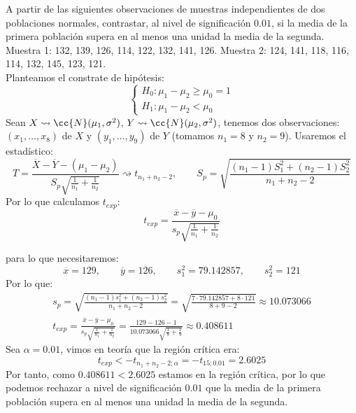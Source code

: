 \begin{ejercicio}
    A partir de las siguientes observaciones de muestras independientes de dos poblaciones normales, contrastar, al nivel de significación $0.01$, si la media de la primera población supera en al menos una unidad la media de la segunda.\newline
    Muestra 1: 132, 139, 126, 114, 122, 132, 141, 126.\newline
    Muestra 2: 124, 141, 118, 116, 114, 132, 145, 123, 121.\\

    \noindent
    Planteamos el constrate de hipótesis:
    \begin{equation*}
        \left\{\begin{array}{l}
            H_0 : \mu_1-\mu_2 \geq \mu_0 = 1 \\
            H_1 : \mu_1-\mu_2 < \mu_0
        \end{array}\right.
    \end{equation*}
    Sean $X\rightsquigarrow \cc{N}(\mu_1, \sigma^2)$, $Y\rightsquigarrow\cc{N}(\mu_2,\sigma^2)$, tenemos dos observaciones: $(x_1, \ldots, x_8)$ de $X$ y $(y_1, \ldots, y_9)$ de $Y$ (tomamos $n_1=8$ y $n_2 = 9$). Usaremos el estadístico:
    \begin{equation*}
        T = \frac{\overline{X}-\overline{Y}-(\mu_1-\mu_2)}{S_p\sqrt{\frac{1}{n_1}+\frac{1}{n_2}}}\rightsquigarrow t_{n_1+n_2-2} , \qquad S_p = \sqrt{\frac{(n_1-1)S_1^2 + (n_2-1)S_2^2}{n_1+n_2-2}}
    \end{equation*}
    Por lo que calculamos $t_{exp}$: 
    \begin{equation*}
        t_{exp} = \frac{\overline{x}-\overline{y}-\mu_0}{s_p\sqrt{\frac{1}{n_1}+\frac{1}{n_2}}}
    \end{equation*}

    para lo que necesitaremos:
    \begin{equation*}
        \overline{x} = 129, \qquad \overline{y} = 126, \qquad s_1^2 = 79.142857, \qquad s_2^2 = 121
    \end{equation*}
    Por lo que:
    \begin{gather*}
        s_p = \sqrt{\frac{(n_1-1)s_1^2 + (n_2-1)s_2^2}{n_1+n_2-2}} = \sqrt{\frac{7\cdot 79.142857 + 8\cdot 121}{8+9-2}}  \approx 10.073066 \\
        t_{exp} = \frac{\overline{x}-\overline{y}-\mu_0}{s_p\sqrt{\frac{1}{n_1}+\frac{1}{n_2}}} = \frac{129 - 126 -1}{10.073066 \sqrt{\frac{1}{8} + \frac{1}{9}}} \approx 0.408611
    \end{gather*}
    Sea $\alpha = 0.01$, vimos en teoría que la región crítica era:
    \begin{equation*}
        t_{exp} < -t_{n_1+n_2-2;\alpha} = -t_{15;0.01} = 2.6025
    \end{equation*}
    Por tanto, como $0.408611 < 2.6025$ estamos en la región crítica, por lo que podemos rechazar a nivel de significación $0.01$ que la media de la primera población supera en al menos una unidad la media de la segunda.
\end{ejercicio}

